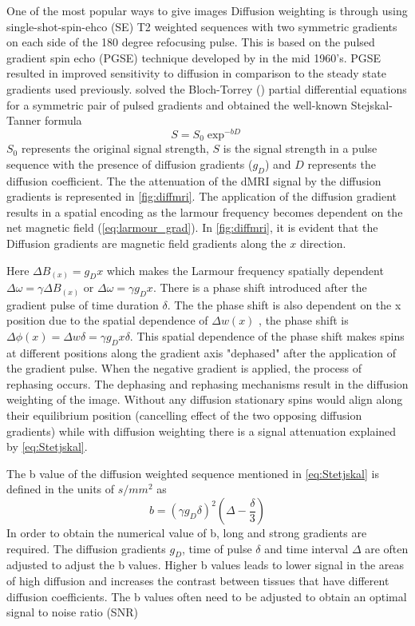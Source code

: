 \documentclass[msthesis.tex]{subfiles}
\begin{document}
One of the most popular ways to give images Diffusion weighting is through using single-shot-spin-ehco (SE) T2 weighted sequences with two symmetric gradients on each side of the 180 degree refocusing pulse. This is based on the pulsed gradient spin echo (PGSE) technique developed by \cite{stejskal1965spin} in the mid 1960's. PGSE resulted in improved sensitivity to diffusion in comparison to the steady state gradients used previously. \cite{stejskal1965spin} solved the Bloch-Torrey (\cite{bloch1946nuclear}) partial differential equations for a symmetric pair of pulsed gradients and obtained the well-known Stejskal-Tanner formula
\begin{equation}
\label{eq:Stetjskal}
S = S_0 \exp^{-bD}
\end{equation}
$S_0$ represents the original signal strength, $S$ is the signal strength in a pulse sequence with the presence of diffusion gradients ($g_D$) and $D$ represents the diffusion coefficient. The the attenuation of the dMRI signal by the diffusion gradients is represented in \autoref{fig:diffmri}. The application of the diffusion gradient results in a spatial encoding as the larmour frequency becomes dependent on the net magnetic field (\autoref{eq:larmour_grad}). In \autoref{fig:diffmri}, it is evident that the Diffusion gradients are magnetic field gradients along the $x$ direction. 

Here $\Delta B_(x) = g_D x$ which makes the Larmour frequency spatially dependent $\Delta \omega = \gamma \Delta B_(x)$ or $\Delta \omega = \gamma g_D x$. There is a phase shift introduced after the gradient pulse of time duration $\delta$. The the phase shift is also dependent on the x position due to the spatial dependence of $\Delta w(x)$ , the phase shift is $\Delta \phi (x) = \Delta w \delta = \gamma g_D x \delta$. This spatial dependence of the phase shift makes spins at different positions along the gradient axis "dephased" after the application of the gradient pulse. When the negative gradient is applied, the process of rephasing occurs. The dephasing and rephasing mechanisms result in the diffusion weighting of the image. Without any diffusion stationary spins would align along their equilibrium position (cancelling effect of the two opposing diffusion gradients) while with diffusion weighting there is a signal attenuation explained by \autoref{eq:Stetjskal}. 

The b value of the diffusion weighted sequence mentioned in \autoref{eq:Stetjskal} is defined in the units of $s/mm^2$ as
\begin{equation}
    b = (\gamma g_D \delta)^2 (\Delta - \frac{\delta}{3})
\end{equation}
In order to obtain the numerical value of b, long and strong gradients are required. The diffusion gradients $g_D$, time of pulse $\delta$ and time interval $\Delta$ are often adjusted to adjust the b values. Higher b values leads to lower signal in the areas of high diffusion and increases the contrast between tissues that have different diffusion coefficients. The b values often need to be adjusted to obtain an optimal signal to noise ratio (SNR)
\end{document}
